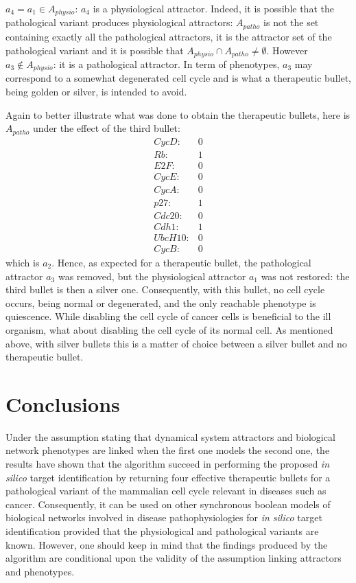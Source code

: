\documentclass[oneside,a4paper,onecolumn,notitlepage]{article}
\begin{document}
$a_{4}=a_{1}\in A_{physio}$: $a_{4}$ is a physiological attractor. Indeed, it is possible that the pathological variant produces physiological attractors: $A_{patho}$ is not the set containing exactly all the pathological attractors, it is the attractor set of the pathological variant and it is possible that $A_{physio}\cap A_{patho}\neq \emptyset$. However $a_3\notin A_{physio}$: it is a pathological attractor. In term of phenotypes, $a_3$ may correspond to a somewhat degenerated cell cycle and is what a therapeutic bullet, being golden or silver, is intended to avoid.

Again to better illustrate what was done to obtain the therapeutic bullets, here is $A_{patho}$ under the effect of the third bullet:
\begin{equation*}
\begin{matrix}
CycD:&0\\
Rb:&1\\
E2F:&0\\
CycE:&0\\
CycA:&0\\
p27:&1\\
Cdc20:&0\\
Cdh1:&1\\
UbcH10:&0\\
CycB:&0
\end{matrix}
\end{equation*}
which is $a_{2}$. Hence, as expected for a therapeutic bullet, the pathological attractor $a_{3}$ was removed, but the physiological attractor $a_{1}$ was not restored: the third bullet is then a silver one. Consequently, with this bullet, no cell cycle occurs, being normal or degenerated, and the only reachable phenotype is quiescence. While disabling the cell cycle of cancer cells is beneficial to the ill organism, what about disabling the cell cycle of its normal cell. As mentioned above, with silver bullets this is a matter of choice between a silver bullet and no therapeutic bullet.

\section*{Conclusions}
Under the assumption stating that dynamical system attractors and biological network phenotypes are linked when the first one models the second one, the results have shown that the algorithm succeed in performing the proposed \textit{in silico} target identification by returning four effective therapeutic bullets for a pathological variant of the mammalian cell cycle relevant in diseases such as cancer. Consequently, it can be used on other synchronous boolean models of biological networks involved in disease pathophysiologies for \textit{in silico} target identification provided that the physiological and pathological variants are known. However, one should keep in mind that the findings produced by the algorithm are conditional upon the validity of the assumption linking attractors and phenotypes.
\end{document}
